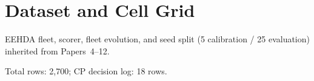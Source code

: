 \section{Dataset and Cell Grid}

EEHDA fleet, scorer, fleet evolution, and seed split (5 calibration
/ 25 evaluation) inherited from Papers~4--12.



Total rows: 2{,}700; CP decision log: 18 rows.
